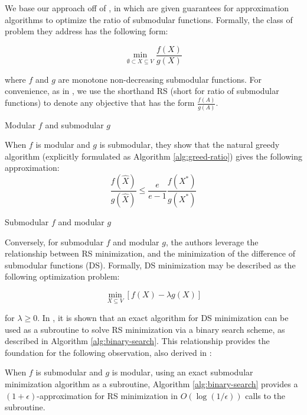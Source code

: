 We base our approach off of \cite{bai2016algorithms}, in which are given guarantees for approximation algorithms to optimize the ratio of submodular functions.
Formally, the class of problem they address has the following form:

\begin{problem}
	\label{prob:RS-min}
	\[ \underset{\emptyset \subset X \subseteq V}{\min} \frac{f(X)}{g(X)}
	\]
\end{problem}

where $ f $ and $ g $ are monotone non-decreasing submodular functions.
For convenience, as in \cite{bai2016algorithms}, we use the shorthand RS (short for ratio of submodular functions) to denote any objective that has the form $ \frac{f(A)}{g(A)} $.

\begin{property}
	\label{prop:mod-f-submod-g}
	Modular $ f $ and submodular $ g $
\end{property}

When $ f $ is modular and $ g $ is submodular, they show that the natural greedy algorithm (explicitly formulated as Algorithm \ref{alg:greed-ratio}) gives the following approximation:
\begin{equation}
	\label{eq:greedy-approx}
	\frac{f(\hat{X})}{g(\hat{X})} \leq \frac{e}{e - 1} \frac{f(X^*)}{g(X^*)}
\end{equation}
 

 
\begin{property}
	\label{prop:submod-f-mod-g}
	Submodular $ f $ and modular $ g $
\end{property}
Conversely, for submodular $ f $ and modular $ g $, the authors leverage the relationship between RS minimization, and the minimization of the difference of submodular functions (DS). Formally, DS minimization may be described as the following optimization problem:
\begin{problem}
	\label{prob:DS-min}
	\[
	\underset{X \subseteq V}{\min} \left[ f(X) - \lambda g(X) \right]
	\]
\end{problem}
for $ \lambda \geq 0 $.
In \cite{bai2016algorithms}, it is shown that an exact algorithm for DS minimization can be used as a subroutine to solve RS minimization via a binary search scheme, as described in Algorithm \ref{alg:binary-search}.
This relationship provides the foundation for the following observation, also derived in \cite{bai2016algorithms}:
\begin{theorem}
	When $ f $ is submodular and $ g $ is modular, using an exact submodular minimization algorithm as a subroutine, Algorithm \ref{alg:binary-search} provides a $ (1 + \epsilon) $-approximation for RS minimization in $ O(\log(1/\epsilon)) $ calls to the subroutine.
\end{theorem}

